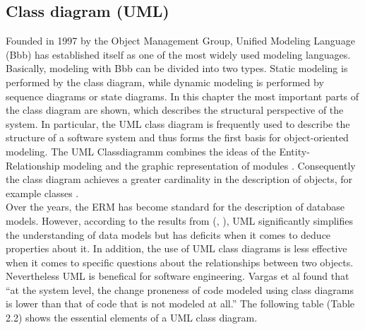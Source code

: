 \subsection{Class diagram (UML)}
Founded in 1997 by the Object Management Group, Unified Modeling Language (\gls{Bbb}) has established itself as one of the most widely used modeling languages. \cite{EdSeidewitz.2003} Basically, modeling with \gls{Bbb} can be divided into two types. Static modeling is performed by the class diagram, while dynamic modeling is performed by sequence diagrams or state diagrams. In this chapter the most important parts of the class diagram are shown, which describes the structural perspective of the system. In particular, the UML class diagram is frequently used to describe the structure of a software system and thus forms the first basis for object-oriented modeling. The UML Classdiagramm combines the ideas of the Entity-Relationship modeling and the graphic representation of modules \cite{Benker.2016}. Consequently the class diagram achieves a greater cardinality in the description of objects, for example classes \cite{Pohl.2015}.
\\
Over the years, the ERM has become standard for the description of database models.\cite{ShamkantB.Navathe.1992} However, according to the results from (\cite{AndreaDeLuciaCarmineGravinoRoccoOlivetoGenoveffaTortora.2008}, \cite{AndyS.Evans.1998}), UML significantly simplifies the understanding of data models but has deficits when it comes to deduce properties about it. In addition, the use of UML class diagrams is less effective when it comes to specific questions about the relationships between two objects. Nevertheless UML is benefical for software engineering.
Vargas et al \cite{RutTorresVargasAriadiNugrohoMichelChaudronJoostVisser.2012} found that “at the system level, the change
proneness of code modeled using class diagrams is lower
than that of code that is not modeled at all.” 
\newpage
The following table (Table 2.2) shows the essential elements of a UML class diagram.
